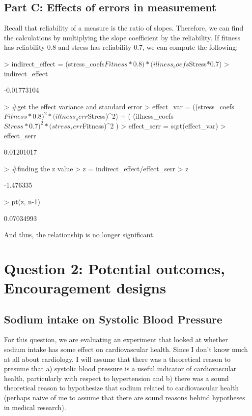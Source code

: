\documentclass{article}
\begin{document}
\subsection{Part C: Effects of errors in measurement}
Recall that reliability of a measure is the ratio of slopes.  Therefore, we can find the calculations by multiplying the slope coefficient by the reliability. If fitness has reliability 0.8 and stress has reliability 0.7, we can compute the following:
\begin{Schunk}
\begin{Sinput}
> indirect_effect = (stress_coefs$Fitness*0.8) * (illness_coefs$Stress*0.7)
> indirect_effect
\end{Sinput}
\begin{Soutput}
[1] -0.01773104
\end{Soutput}
\begin{Sinput}
> #get the effect variance and standard error
> effect_var = ((stress_coefs$Fitness * 0.8)^2 * (illness_serr$Stress)^2) + 
   ( (illness_coefs$Stress*0.7)^2 * (stress_serr$Fitness)^2 )
> effect_serr = sqrt(effect_var)
> effect_serr
\end{Sinput}
\begin{Soutput}
[1] 0.01201017
\end{Soutput}
\begin{Sinput}
>               #finding the z value
>               z = indirect_effect/effect_serr
>               z
\end{Sinput}
\begin{Soutput}
[1] -1.476335
\end{Soutput}
\begin{Sinput}
>               pt(z, n-1)
\end{Sinput}
\begin{Soutput}
[1] 0.07034993
\end{Soutput}
\end{Schunk}

And thus, the relationship is no longer significant.

\section{Question 2: Potential outcomes, Encouragement designs}

\subsection{Sodium intake on Systolic Blood Pressure}
For this question, we are evaluating an experiment that looked at whether sodium intake has some effect on cardiovascular health.  Since I don't know much at all about cardiology, I will assume that there was a theoretical reason to presume that a) systolic blood pressure is a useful indicator of cardiovascular health, particularly with respect to hypertension and b) there was a sound theoretical reason to hypothesize that sodium related to cardiovascular health (perhaps naive of me to assume that there are sound reasons behind hypotheses in medical research).
\end{document}
